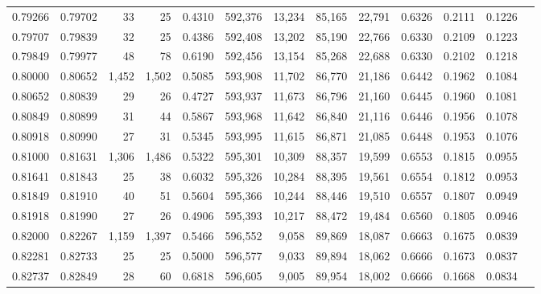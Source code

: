 \begin{tabular}{rrrrrrrrrrrrr}
0.79266 & 0.79702 &     33 &    25 &                                     0.4310 & 592,376 &  13,234 &  85,165 &  22,791 & 0.6326 & 0.2111 & 0.1226 \\
0.79707 & 0.79839 &     32 &    25 &                                     0.4386 & 592,408 &  13,202 &  85,190 &  22,766 & 0.6330 & 0.2109 & 0.1223 \\
0.79849 & 0.79977 &     48 &    78 &                                     0.6190 & 592,456 &  13,154 &  85,268 &  22,688 & 0.6330 & 0.2102 & 0.1218 \\
0.80000 & 0.80652 &  1,452 & 1,502 &                                     0.5085 & 593,908 &  11,702 &  86,770 &  21,186 & 0.6442 & 0.1962 & 0.1084 \\
0.80652 & 0.80839 &     29 &    26 &                                     0.4727 & 593,937 &  11,673 &  86,796 &  21,160 & 0.6445 & 0.1960 & 0.1081 \\
0.80849 & 0.80899 &     31 &    44 &                                     0.5867 & 593,968 &  11,642 &  86,840 &  21,116 & 0.6446 & 0.1956 & 0.1078 \\
0.80918 & 0.80990 &     27 &    31 &                                     0.5345 & 593,995 &  11,615 &  86,871 &  21,085 & 0.6448 & 0.1953 & 0.1076 \\
0.81000 & 0.81631 &  1,306 & 1,486 &                                     0.5322 & 595,301 &  10,309 &  88,357 &  19,599 & 0.6553 & 0.1815 & 0.0955 \\
0.81641 & 0.81843 &     25 &    38 &                                     0.6032 & 595,326 &  10,284 &  88,395 &  19,561 & 0.6554 & 0.1812 & 0.0953 \\
0.81849 & 0.81910 &     40 &    51 &                                     0.5604 & 595,366 &  10,244 &  88,446 &  19,510 & 0.6557 & 0.1807 & 0.0949 \\
0.81918 & 0.81990 &     27 &    26 &                                     0.4906 & 595,393 &  10,217 &  88,472 &  19,484 & 0.6560 & 0.1805 & 0.0946 \\
0.82000 & 0.82267 &  1,159 & 1,397 &                                     0.5466 & 596,552 &   9,058 &  89,869 &  18,087 & 0.6663 & 0.1675 & 0.0839 \\
0.82281 & 0.82733 &     25 &    25 &                                     0.5000 & 596,577 &   9,033 &  89,894 &  18,062 & 0.6666 & 0.1673 & 0.0837 \\
0.82737 & 0.82849 &     28 &    60 &                                     0.6818 & 596,605 &   9,005 &  89,954 &  18,002 & 0.6666 & 0.1668 & 0.0834 \\

\end{tabular}
